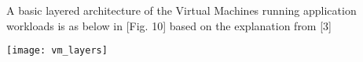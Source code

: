 \documentclass[../seminar.tex]{subfiles}
\begin{document}
\begin{flushleft}
		
A basic layered architecture of the Virtual Machines running application workloads is as below in [Fig. 10] based on the explanation from [3]
	
\texttt{[image: vm\_layers]}

\end{flushleft}
	
\end{document}
